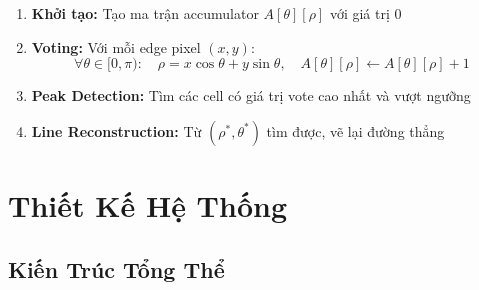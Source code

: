 \documentclass[12pt,a4paper]{report}
\begin{document}
\begin{enumerate}
    \item \textbf{Khởi tạo:} Tạo ma trận accumulator $A[\theta][\rho]$ với giá trị 0
    
    \item \textbf{Voting:} Với mỗi edge pixel $(x, y)$:
    \begin{equation}
        \forall \theta \in [0, \pi): \quad \rho = x\cos\theta + y\sin\theta, \quad A[\theta][\rho] \gets A[\theta][\rho] + 1
    \end{equation}
    
    \item \textbf{Peak Detection:} Tìm các cell có giá trị vote cao nhất và vượt ngưỡng
    
    \item \textbf{Line Reconstruction:} Từ $(\rho^*, \theta^*)$ tìm được, vẽ lại đường thẳng
\end{enumerate}

\chapter{Thiết Kế Hệ Thống}

\section{Kiến Trúc Tổng Thể}
\end{document}

